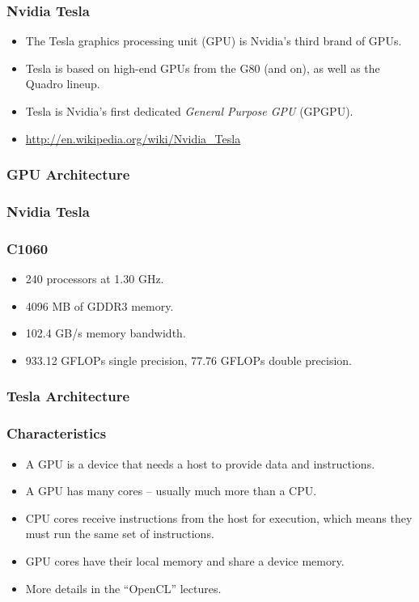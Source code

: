 \documentclass{beamer}
\begin{document}
\begin{CJK}{UTF8}{bsmi}
\begin{frame}
\frametitle{Nvidia Tesla}
\begin{itemize}
\item The Tesla graphics processing unit (GPU) is Nvidia's third brand
  of GPUs. 
\item Tesla is based on high-end GPUs from the G80 (and on), as well
  as the Quadro lineup.
\item Tesla is Nvidia's first dedicated {\em General Purpose GPU}
  (GPGPU).
\item \url{http://en.wikipedia.org/wiki/Nvidia_Tesla}
\end{itemize}
\end{frame}

\begin{frame}
\frametitle{GPU Architecture}
\centerline{}
\end{frame}

\begin{frame}
\frametitle{Nvidia Tesla}
\centerline{}
\end{frame}

\begin{frame}
\frametitle{C1060}
\begin{itemize}
\item 240 processors at 1.30 GHz.
\item 4096 MB of GDDR3 memory.
\item 102.4 GB/s memory bandwidth.
\item 933.12 GFLOPs single precision, 77.76 GFLOPs double precision.
\end{itemize}
\end{frame}

\begin{frame}
\frametitle{Tesla Architecture}
\centerline{}
\end{frame}

\begin{frame}
\frametitle{Characteristics}
\begin{itemize}
\item A GPU is a device that needs a host to provide data and instructions.
\item A GPU has many cores -- usually much more than a CPU.
\item CPU cores receive instructions from the host for execution, which means they must run the same set of instructions.
\item  GPU cores have their local memory and share a device memory.
\item More details in the ``OpenCL'' lectures.
\end{itemize}
\end{frame}



\end{CJK}
\end{document}
